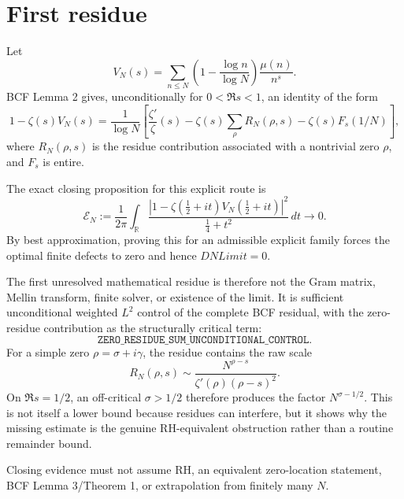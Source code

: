\section{First residue}
Let
\[
V_N(s)=\sum_{n\le N}\left(1-\frac{\log n}{\log N}\right)\frac{\mu(n)}{n^s}.
\]
BCF Lemma 2 gives, unconditionally for $0<\Re s<1$, an identity of the form
\[
1-\zeta(s)V_N(s)=\frac1{\log N}\left[\frac{\zeta'}{\zeta}(s)-\zeta(s)\sum_\rho R_N(\rho,s)-\zeta(s)F_s(1/N)\right],
\]
where $R_N(\rho,s)$ is the residue contribution associated with a nontrivial zero $\rho$, and $F_s$ is entire.

The exact closing proposition for this explicit route is
\[
\boxed{
\mathcal E_N:=\frac1{2\pi}\int_{\mathbb R}\frac{|1-\zeta(\tfrac12+it)V_N(\tfrac12+it)|^2}{\tfrac14+t^2}\,dt\longrightarrow0.
}
\]
By best approximation, proving this for an admissible explicit family forces the optimal finite defects to zero and hence $DNLimit=0$.

The first unresolved mathematical residue is therefore not the Gram matrix, Mellin transform, finite solver, or existence of the limit. It is sufficient unconditional weighted $L^2$ control of the complete BCF residual, with the zero-residue contribution as the structurally critical term:
\[
\boxed{\texttt{ZERO\_RESIDUE\_SUM\_UNCONDITIONAL\_CONTROL}.}
\]
For a simple zero $\rho=\sigma+i\gamma$, the residue contains the raw scale
\[
R_N(\rho,s)\sim\frac{N^{\rho-s}}{\zeta'(\rho)(\rho-s)^2}.
\]
On $\Re s=1/2$, an off-critical $\sigma>1/2$ therefore produces the factor $N^{\sigma-1/2}$. This is not itself a lower bound because residues can interfere, but it shows why the missing estimate is the genuine RH-equivalent obstruction rather than a routine remainder bound.

Closing evidence must not assume RH, an equivalent zero-location statement, BCF Lemma 3/Theorem 1, or extrapolation from finitely many $N$.
